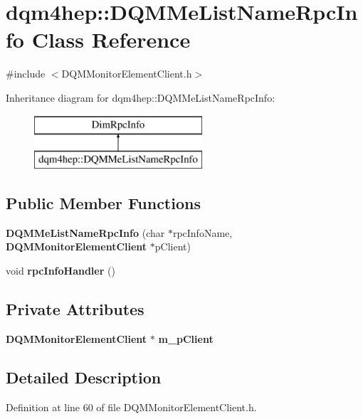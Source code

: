 \section{dqm4hep\+:\+:D\+Q\+M\+Me\+List\+Name\+Rpc\+Info Class Reference}
\label{classdqm4hep_1_1DQMMeListNameRpcInfo}


{\ttfamily \#include $<$D\+Q\+M\+Monitor\+Element\+Client.\+h$>$}

Inheritance diagram for dqm4hep\+:\+:D\+Q\+M\+Me\+List\+Name\+Rpc\+Info\+:\begin{figure}[H]
\begin{center}
\leavevmode
\includegraphics[height=2.000000cm]{classdqm4hep_1_1DQMMeListNameRpcInfo}
\end{center}
\end{figure}
\subsection*{Public Member Functions}
\begin{DoxyCompactItemize}
\item 
{\bf D\+Q\+M\+Me\+List\+Name\+Rpc\+Info} (char $\ast$rpc\+Info\+Name, {\bf D\+Q\+M\+Monitor\+Element\+Client} $\ast$p\+Client)
\item 
void {\bf rpc\+Info\+Handler} ()
\end{DoxyCompactItemize}
\subsection*{Private Attributes}
\begin{DoxyCompactItemize}
\item 
{\bf D\+Q\+M\+Monitor\+Element\+Client} $\ast$ {\bf m\+\_\+p\+Client}
\end{DoxyCompactItemize}


\subsection{Detailed Description}


Definition at line 60 of file D\+Q\+M\+Monitor\+Element\+Client.\+h.



